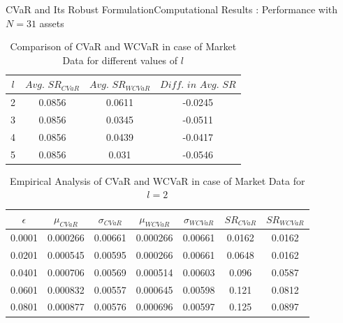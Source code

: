 \documentclass{beamer}
\begin{document}
\begin{frame}{CVaR and Its Robust Formulation}{Computational Results : Performance with $N=31$ assets}
\begin{table}[!h]
    \centering
    \small
    \captionsetup{justification=centering}

   \begin{tabular}{||c|c|c|c||}
   \hline
  
$l$ & $Avg. \, \, SR_{CVaR}$ & $Avg. \, \, SR_{WCVaR}$ & $Diff. \, \, in \, \, Avg. \, \, SR$ \\
  
  \hline
2 & 0.0856 & 0.0611 & -0.0245 \\
3 & 0.0856 & 0.0345 & -0.0511 \\
4 & 0.0856 & 0.0439 & -0.0417 \\
5 & 0.0856 & 0.031 & -0.0546 \\
  \hline
\end{tabular}
    \caption{Comparison of CVaR and WCVaR in case of Market Data for different values of $l$}
    \label{avgtab:6.1}
\end{table}

\begin{table}[!h]
    \centering
    \small
    \captionsetup{justification=centering}

   \begin{tabular}{||c|c|c|c|c|c|c||}
   \hline
  
$\epsilon$ & $\mu_{CVaR}$ & $\sigma_{CVaR}$ & $\mu_{WCVaR}$ & $\sigma_{WCVaR}$ & $SR_{CVaR}$ & $SR_{WCVaR}$\\
  
  \hline
0.0001 & 0.000266 & 0.00661 & 0.000266 & 0.00661 & 0.0162 & 0.0162 \\
0.0201 & 0.000545 & 0.00595 & 0.000266 & 0.00661 & 0.0648 & 0.0162 \\
0.0401 & 0.000706 & 0.00569 & 0.000514 & 0.00603 & 0.096 & 0.0587 \\
0.0601 & 0.000832 & 0.00557 & 0.000645 & 0.00598 & 0.121 & 0.0812 \\
0.0801 & 0.000877 & 0.00576 & 0.000696 & 0.00597 & 0.125 & 0.0897 \\
  \hline
\end{tabular}
    \caption{Empirical Analysis of CVaR and WCVaR in case of Market Data for $l=2$}
    \label{tab:6.1}
\end{table}


\end{frame}
\end{document}
